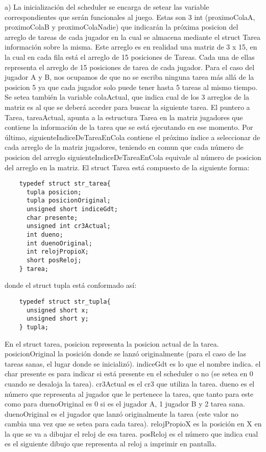 \documentclass[a4paper]{article}
\begin{document}
a)	La inicialización del scheduler se encarga de setear las variable correspondientes que serán funcionales al juego. Estas son 3 int (proximoColaA, proximoColaB y proximoColaNadie)
que indicarán la próxima posicion del arreglo de tareas de cada jugador en la cual se almacena mediante el struct Tarea información sobre la misma. Este arreglo es en realidad una matriz
de 3 x 15, en la cual en cada fila está el arreglo de 15 posiciones de Tareas. Cada una de ellas representa el arreglo de 15 posiciones de tarea de cada jugador. Para el caso del jugador A y B,
nos ocupamos de que no se escriba ninguna tarea más allá de la posicion 5 ya que cada jugador solo puede tener hasta 5 tareas al mismo tiempo. Se setea también la variable
colaActual, que indica cual de los 3 arreglos de la matriz es al que se deberá acceder para buscar la siguiente tarea. El puntero a Tarea, tareaActual, apunta a la estructura Tarea
en la matriz jugadores que contiene la información de la tarea que se está ejecutando en ese momento. Por último, siguienteIndiceDeTareaEnCola contiene el próximo índice a seleccionar de cada arreglo de la matriz jugadores,
teniendo en comun que cada número de posicion del arreglo siguienteIndiceDeTareaEnCola equivale al número de posicion del arreglo en la matriz.
El struct Tarea está compuesto de la siguiente forma:
\begin{verbatim}
	typedef struct str_tarea{
	  tupla posicion;
	  tupla posicionOriginal;
	  unsigned short indiceGdt;
	  char presente;
	  unsigned int cr3Actual;
	  int dueno;
	  int duenoOriginal;
	  int relojPropioX;
	  short posReloj;
	} tarea;
\end{verbatim}
donde el struct tupla está conformado así:
\begin{verbatim}
	typedef struct str_tupla{
	  unsigned short x;
	  unsigned short y;
	} tupla;
\end{verbatim}
En el struct tarea, posicion representa la posicion actual de la tarea. posicionOriginal la posición donde se lanzó originalmente (para el caso de las tareas sanas, el lugar donde se inicializó).
indiceGdt es lo que el nombre indica. el char presente es para indicar si está presente en el scheduler o no (se setea en 0 cuando se desaloja la tarea). cr3Actual es el cr3 que utiliza la tarea.
dueno es el número que representa al jugador que le pertenece la tarea, que tanto para este como para duenoOriginal es 0 si es el jugador A, 1 jugador B y 2 tarea sana.
duenoOriginal es el jugador que lanzó originalmente la tarea (este valor no cambia una vez que se setea para cada tarea). relojPropioX es la posición en X en la que se va a dibujar
el reloj de esa tarea. posReloj es el número que indica cual es el siguiente dibujo que representa al reloj a imprimir en pantalla.
\end{document}
